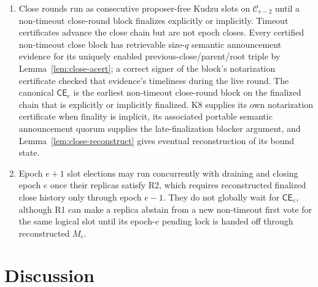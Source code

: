 \documentclass[11pt]{article}
\theoremstyle{definition}
\theoremstyle{remark}
\newcommand{\C}{\mathcal C}
\newcommand{\CE}{\mathsf{CE}}
\begin{document}
\begin{enumerate}[leftmargin=2.0em]
  \item Close rounds run as consecutive proposer-free Kudzu slots on $\C_{e-2}$ until a non-timeout close-round block finalizes explicitly or implicitly. Timeout certificates advance the close chain but are not epoch closes. Every certified non-timeout close block has retrievable size-$q$ semantic announcement evidence for its uniquely enabled previous-close/parent/root triple by Lemma~\ref{lem:close-acert}; a correct signer of the block's notarization certificate checked that evidence's timeliness during the live round. The canonical $\CE_e$ is the earliest non-timeout close-round block on the finalized chain that is explicitly or implicitly finalized. K8 supplies its own notarization certificate when finality is implicit, its associated portable semantic announcement quorum supplies the late-finalization blocker argument, and Lemma~\ref{lem:close-reconstruct} gives eventual reconstruction of its bound state.

  \item Epoch $e+1$ slot elections may run concurrently with draining and closing epoch $e$ once their replicas satisfy R2, which requires reconstructed finalized close history only through epoch $e-1$. They do not globally wait for $\CE_e$, although R1 can make a replica abstain from a new non-timeout first vote for the same logical slot until its epoch-$e$ pending lock is handed off through reconstructed $M_e$.
\end{enumerate}

\section{Discussion}
\end{document}
